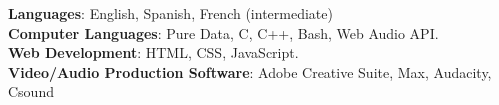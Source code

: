 \textbf{Languages}: English, Spanish, French (intermediate)
\\
\textbf{Computer Languages}: Pure Data, C, C++, Bash, Web Audio API.
\\
\textbf{Web Development}: HTML, CSS, JavaScript.
\\
\textbf{Video/Audio Production Software}: Adobe Creative Suite, Max, Audacity, Csound   